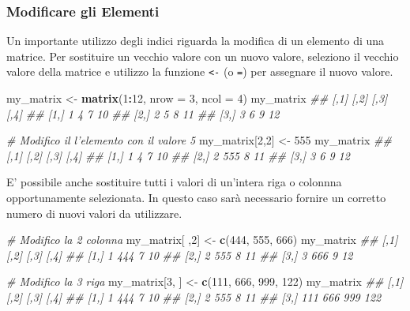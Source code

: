 \documentclass[
]{book}
\newenvironment{Shaded}{\begin{snugshade}}{\end{snugshade}}
\newcommand{\CommentTok}[1]{\textcolor[rgb]{0.56,0.35,0.01}{\textit{#1}}}
\newcommand{\DataTypeTok}[1]{\textcolor[rgb]{0.13,0.29,0.53}{#1}}
\newcommand{\DecValTok}[1]{\textcolor[rgb]{0.00,0.00,0.81}{#1}}
\newcommand{\KeywordTok}[1]{\textcolor[rgb]{0.13,0.29,0.53}{\textbf{#1}}}
\newcommand{\NormalTok}[1]{#1}
\newcommand{\OperatorTok}[1]{\textcolor[rgb]{0.81,0.36,0.00}{\textbf{#1}}}
\newcommand{\StringTok}[1]{\textcolor[rgb]{0.31,0.60,0.02}{#1}}
\begin{document}
\hypertarget{modificare-gli-elementi-1}{%
\subsubsection*{Modificare gli Elementi}\label{modificare-gli-elementi-1}}

Un importante utilizzo degli indici riguarda la modifica di un elemento di una matrice. Per sostituire un vecchio valore con un nuovo valore, seleziono il vecchio valore della matrice e utilizzo la funzione \texttt{\textless{}-} (o \texttt{=}) per assegnare il nuovo valore.

\begin{Shaded}
\begin{Highlighting}[]
\NormalTok{my_matrix <-}\StringTok{ }\KeywordTok{matrix}\NormalTok{(}\DecValTok{1}\OperatorTok{:}\DecValTok{12}\NormalTok{, }\DataTypeTok{nrow =} \DecValTok{3}\NormalTok{, }\DataTypeTok{ncol =} \DecValTok{4}\NormalTok{)}
\NormalTok{my_matrix}
\CommentTok{##      [,1] [,2] [,3] [,4]}
\CommentTok{## [1,]    1    4    7   10}
\CommentTok{## [2,]    2    5    8   11}
\CommentTok{## [3,]    3    6    9   12}

\CommentTok{# Modifico il l'elemento con il valore 5}
\NormalTok{my_matrix[}\DecValTok{2}\NormalTok{,}\DecValTok{2}\NormalTok{] <-}\StringTok{ }\DecValTok{555}
\NormalTok{my_matrix}
\CommentTok{##      [,1] [,2] [,3] [,4]}
\CommentTok{## [1,]    1    4    7   10}
\CommentTok{## [2,]    2  555    8   11}
\CommentTok{## [3,]    3    6    9   12}
\end{Highlighting}
\end{Shaded}

E' possibile anche sostituire tutti i valori di un'intera riga o colonnna opportunamente selezionata. In questo caso sarà necessario fornire un corretto numero di nuovi valori da utilizzare.

\begin{Shaded}
\begin{Highlighting}[]
\CommentTok{# Modifico la 2 colonna}
\NormalTok{my_matrix[ ,}\DecValTok{2}\NormalTok{] <-}\StringTok{ }\KeywordTok{c}\NormalTok{(}\DecValTok{444}\NormalTok{, }\DecValTok{555}\NormalTok{, }\DecValTok{666}\NormalTok{)}
\NormalTok{my_matrix}
\CommentTok{##      [,1] [,2] [,3] [,4]}
\CommentTok{## [1,]    1  444    7   10}
\CommentTok{## [2,]    2  555    8   11}
\CommentTok{## [3,]    3  666    9   12}

\CommentTok{# Modifico la 3 riga}
\NormalTok{my_matrix[}\DecValTok{3}\NormalTok{, ] <-}\StringTok{ }\KeywordTok{c}\NormalTok{(}\DecValTok{111}\NormalTok{, }\DecValTok{666}\NormalTok{, }\DecValTok{999}\NormalTok{, }\DecValTok{122}\NormalTok{)}
\NormalTok{my_matrix}
\CommentTok{##      [,1] [,2] [,3] [,4]}
\CommentTok{## [1,]    1  444    7   10}
\CommentTok{## [2,]    2  555    8   11}
\CommentTok{## [3,]  111  666  999  122}
\end{Highlighting}
\end{Shaded}
\end{document}
